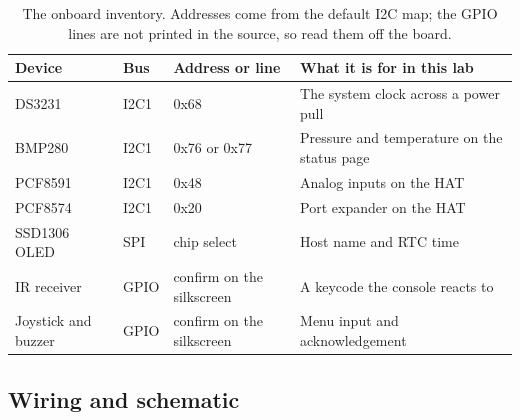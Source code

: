 \begin{table}[H]\centering\small
\begin{tabular}{p{34mm}p{20mm}p{30mm}p{62mm}}
\toprule
Device & Bus & Address or line & What it is for in this lab \\
\midrule
DS3231 & I2C1 & 0x68 & The system clock across a power pull \\
BMP280 & I2C1 & 0x76 or 0x77 & Pressure and temperature on the status page \\
PCF8591 & I2C1 & 0x48 & Analog inputs on the HAT \\
PCF8574 & I2C1 & 0x20 & Port expander on the HAT \\
SSD1306 OLED & SPI & chip select & Host name and RTC time \\
IR receiver & GPIO & confirm on the silkscreen & A keycode the console reacts to \\
Joystick and buzzer & GPIO & confirm on the silkscreen & Menu input and acknowledgement \\
\bottomrule
\end{tabular}
\caption{The onboard inventory. Addresses come from the default I2C map; the GPIO lines are not printed in the source, so read them off the board.}
\end{table}

\subsection*{Wiring and schematic}


